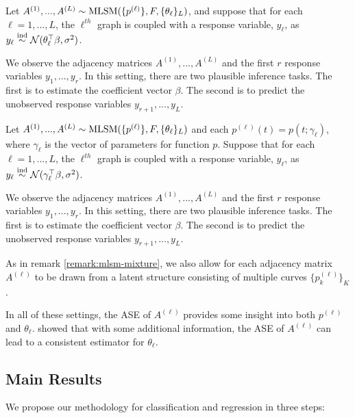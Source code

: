\documentclass[12pt]{article}
\begin{document}
\begin{definition}
\label{def:mlsm-r-1}
Let $A^{(1)}, ..., A^{(L)} \sim \mathrm{MLSM}(\{p^{(\ell)}\}, F, \{\theta_\ell\}_L)$, and suppose that for each $\ell = 1, ..., L$, the $\ell^{th}$ graph is coupled with a response variable, $y_\ell$, as $y_\ell \stackrel{\mathrm{ind}}{\sim} \mathcal{N}(\theta_\ell^\top \beta, \sigma^2)$. 

We observe the adjacency matrices $A^{(1)}, ..., A^{(L)}$ and the first $r$ response variables $y_1, ..., y_r$. 
In this setting, there are two plausible inference tasks. 
The first is to estimate the coefficient vector $\beta$. 
The second is to predict the unobserved response variables $y_{r+1}, ..., y_L$. 
\end{definition}

\begin{definition}
\label{def:mlsm-r-2}
Let $A^{(1)}, ..., A^{(L)} \sim \mathrm{MLSM}(\{p^{(\ell)}\}, F, \{\theta_\ell\}_L)$ and each $p^{(\ell)}(t) = p(t; \gamma_\ell)$, where $\gamma_\ell$ is the vector of parameters for function $p$. 
Suppose that for each $\ell = 1, ..., L$, the $\ell^{th}$ graph is coupled with a response variable, $y_\ell$, as $y_\ell \stackrel{\mathrm{ind}}{\sim} \mathcal{N}(\gamma_\ell^\top \beta, \sigma^2)$. 

We observe the adjacency matrices $A^{(1)}, ..., A^{(L)}$ and the first $r$ response variables $y_1, ..., y_r$. 
In this setting, there are two plausible inference tasks. 
The first is to estimate the coefficient vector $\beta$. 
The second is to predict the unobserved response variables $y_{r+1}, ..., y_L$. 

As in remark \ref{remark:mlsm-mixture}, we also allow for each adjacency matrix $A^{(\ell)}$ to be drawn from a latent structure consisting of multiple curves $\{p^{(\ell)}_k\}_K$. 
\end{definition}

In all of these settings, the ASE of \(A^{(\ell)}\) provides some
insight into both \(p^{(\ell)}\) and \(\theta_\ell\).
\citet{athreya2020estimation} showed that with some additional
information, the ASE of \(A^{(\ell)}\) can lead to a consistent
estimator for \(\theta_\ell\).

\hypertarget{main-results}{%
\subsection{Main Results}\label{main-results}}

We propose our methodology for classification and regression in three
steps:
\end{document}
